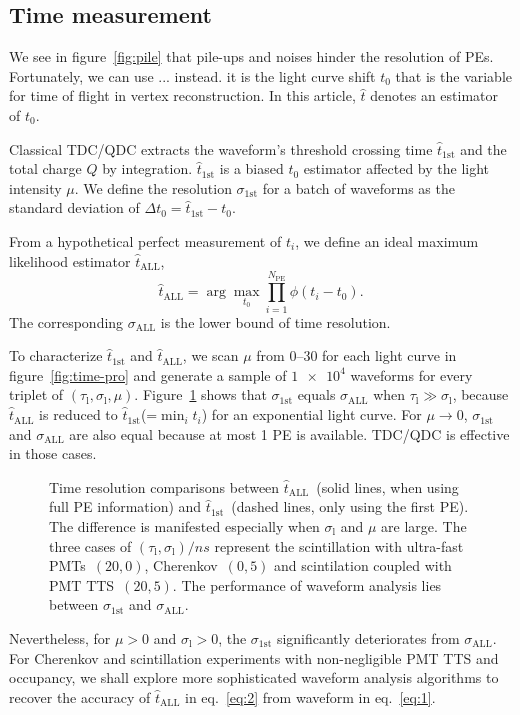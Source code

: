 \subsection{Time measurement}
We see in figure~\ref{fig:pile} that pile-ups and noises hinder the resolution of PEs. Fortunately, we can use ... instead. it is the light curve shift $t_0$ that is the variable for time of flight in vertex reconstruction.  In this article, $\hat{t}$ denotes an estimator of $t_0$.

Classical TDC/QDC extracts the waveform's threshold crossing time $\hat{t}_\mathrm{1st}$ and the total charge $Q$ by integration.  $\hat{t}_\mathrm{1st}$ is a biased $t_0$ estimator affected by the light intensity $\mu$. We define the resolution $\sigma_\mathrm{1st}$ for a batch of waveforms as the standard deviation of $\Delta t_0 = \hat{t}_\mathrm{1st} - t_0$.

From a hypothetical perfect measurement of $t_i$, we define an ideal maximum likelihood estimator $\hat{t}_\mathrm{ALL}$,
\begin{equation}
  \label{eq:2}
  \hat{t}_\mathrm{ALL} = \arg\underset{t_0}{\max} \prod_{i=1}^{N_\mathrm{PE}} \phi(t_i-t_0).
\end{equation}
The corresponding $\sigma_\mathrm{ALL}$ is the lower bound of time resolution. 

To characterize $\hat{t}_\mathrm{1st}$ and $\hat{t}_\mathrm{ALL}$, we scan $\mu$ from \numrange{0}{30} for each light curve in figure~\ref{fig:time-pro} and generate a sample of $\num[retain-unity-mantissa=false]{1e4}$ waveforms for every triplet of $(\tau_\mathrm{l}, \sigma_\mathrm{l}, \mu)$.  Figure~\ref{fig:reso-diff} shows that $\sigma_{\mathrm{1st}}$ equals $\sigma_{\mathrm{ALL}}$ when $\tau_\mathrm{l} \gg \sigma_\mathrm{l}$, because $\hat{t}_\mathrm{ALL}$ is reduced to $\hat{t}_\mathrm{1st}$(=$\min_i t_i$) for an exponential light curve. For $\mu \to 0$, $\sigma_{\mathrm{1st}}$ and $\sigma_{\mathrm{ALL}}$ are also equal because at most 1 PE is available.  TDC/QDC is effective in those cases.

\begin{figure}[H]
  \centering
  \resizebox{0.8\textwidth}{!}{}
  \caption{\label{fig:reso-diff} Time resolution comparisons between $\hat{t}_{\mathrm{ALL}}$~(solid lines, when using full PE information) and $\hat{t}_\mathrm{1st}$~(dashed lines, only using the first PE). The difference is manifested especially when $\sigma_\mathrm{l}$ and $\mu$ are large. The three cases of $(\tau_\mathrm{l}, \sigma_\mathrm{l})/\si{ns}$ represent the scintillation with ultra-fast PMTs~$(20, 0)$, Cherenkov~$(0, 5)$ and scintilation coupled with PMT TTS~$(20, 5)$. The performance of waveform analysis lies between $\sigma_{\mathrm{1st}}$ and $\sigma_{\mathrm{ALL}}$. }
\end{figure}

Nevertheless, for $\mu >0$ and $\sigma_\mathrm{l} > 0$, the $\sigma_{\mathrm{1st}}$ significantly deteriorates from $\sigma_{\mathrm{ALL}}$.  For Cherenkov and scintillation experiments with non-negligible PMT TTS and occupancy, we shall explore more sophisticated waveform analysis algorithms to recover the accuracy of $\hat{t}_\mathrm{ALL}$ in eq.~\eqref{eq:2} from waveform in eq.~\eqref{eq:1}.

